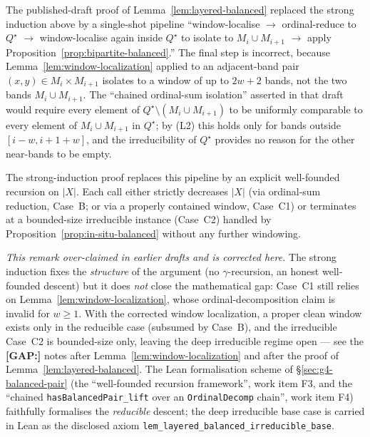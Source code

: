 \begin{remark}\label{rem:old-vs-new}
The published-draft proof of Lemma~\ref{lem:layered-balanced} replaced
the strong induction above by a single-shot pipeline
``window-localise $\to$ ordinal-reduce to $Q^\star$ $\to$
window-localise again inside $Q^\star$ to isolate to $M_i \cup
M_{i+1}$ $\to$ apply Proposition~\ref{prop:bipartite-balanced}.''
The final step is incorrect, because
Lemma~\ref{lem:window-localization} applied to an adjacent-band pair
$(x, y) \in M_i \times M_{i+1}$ isolates to a window of up to $2w+2$
bands, not the two bands $M_i \cup M_{i+1}$. The ``chained
ordinal-sum isolation'' asserted in that draft would require every
element of $Q^\star \setminus (M_i \cup M_{i+1})$ to be uniformly
comparable to every element of $M_i \cup M_{i+1}$ in $Q^\star$; by
(L2) this holds only for bands outside $[i - w, i + 1 + w]$, and the
irreducibility of $Q^\star$ provides no reason for the other near-bands
to be empty.

The strong-induction proof replaces this pipeline by an explicit
well-founded recursion on $|X|$. Each call either strictly decreases
$|X|$ (via ordinal-sum reduction, Case~B; or via a properly contained
window, Case~C1) or terminates at a bounded-size irreducible instance
(Case~C2) handled by Proposition~\ref{prop:in-situ-balanced} without
any further windowing.

\emph{This remark over-claimed in earlier drafts and is corrected
here.} The strong induction fixes the \emph{structure} of the argument
(no $\gamma$-recursion, an honest well-founded descent) but it does
\emph{not} close the mathematical gap: Case~C1 still relies on
Lemma~\ref{lem:window-localization}, whose ordinal-decomposition claim
is invalid for $w \ge 1$. With the corrected window localization, a
proper clean window exists only in the reducible case (subsumed by
Case~B), and the irreducible Case~C2 is bounded-size only, leaving the
deep irreducible regime open --- see the \textbf{[GAP:]} notes after
Lemma~\ref{lem:window-localization} and after the proof of
Lemma~\ref{lem:layered-balanced}. The Lean formalisation scheme of
\S\ref{sec:g4-balanced-pair} (the ``well-founded recursion framework'',
work item F3, and the ``chained \texttt{hasBalancedPair\_lift} over an
\texttt{OrdinalDecomp} chain'', work item F4) faithfully formalises the
\emph{reducible} descent; the deep irreducible base case is carried in
Lean as the disclosed axiom
\texttt{lem\_layered\_balanced\_irreducible\_base}.
\end{remark}

